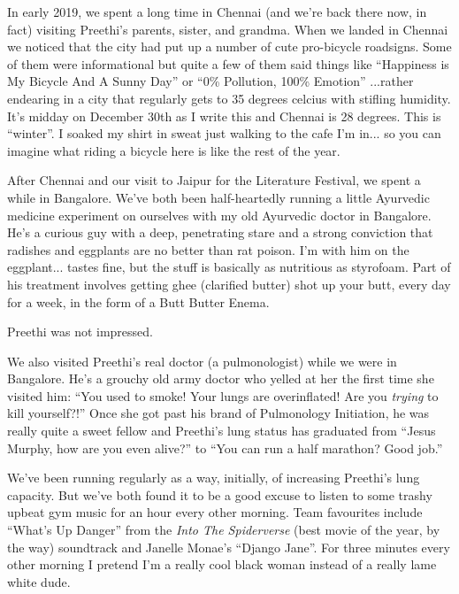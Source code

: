 \documentclass{article}
\begin{document}
In early 2019, we spent a long time in Chennai (and we're back there now, in fact) visiting
Preethi's parents, sister, and grandma. When we landed in Chennai we noticed that the city had
put up a number of cute pro-bicycle roadsigns. Some of them were informational but
quite a few of them said things like ``Happiness is My Bicycle And A Sunny Day'' or
``0\% Pollution, 100\% Emotion'' ...rather endearing in a city that regularly gets to
35 degrees celcius with stifling humidity. It's midday on December 30th as I write
this and Chennai is 28 degrees. This is ``winter''. I soaked my shirt in sweat just walking to the cafe
I'm in... so you can imagine what riding a bicycle here is like the rest of the year.

After Chennai and our visit to Jaipur for the Literature Festival, we spent a while
in Bangalore. We've both been half-heartedly running a little Ayurvedic medicine
experiment on ourselves with my old Ayurvedic doctor in Bangalore. He's a curious guy
with a deep, penetrating stare and a strong conviction that radishes and eggplants
are no better than rat poison. I'm with him on the eggplant... tastes fine, but the
stuff is basically as nutritious as styrofoam. Part of his treatment involves getting ghee (clarified
butter) shot up your butt, every day for a week, in the form of a Butt Butter Enema.

Preethi was not impressed.

We also visited Preethi's real doctor (a pulmonologist) while we were in
Bangalore. He's a grouchy old army doctor who yelled at her the first time she
visited him: ``You used to smoke! Your lungs are overinflated! Are you
\textit{trying} to kill yourself?!'' Once she got past his brand of Pulmonology
Initiation, he was really quite a sweet fellow and Preethi's lung status has
graduated from ``Jesus Murphy, how are you even alive?'' to ``You can run a half marathon? Good job.''

We've been running regularly as a way, initially, of increasing Preethi's lung
capacity. But we've both found it to be a good excuse to listen to some trashy upbeat
gym music for an hour every other morning. Team favourites include ``What's Up
Danger'' from the \textit{Into The Spiderverse} (best movie of the year, by the way)
soundtrack and Janelle Monae's ``Django Jane''. For three minutes every other morning
I pretend I'm a really cool black woman instead of a really lame white dude.
\end{document}
